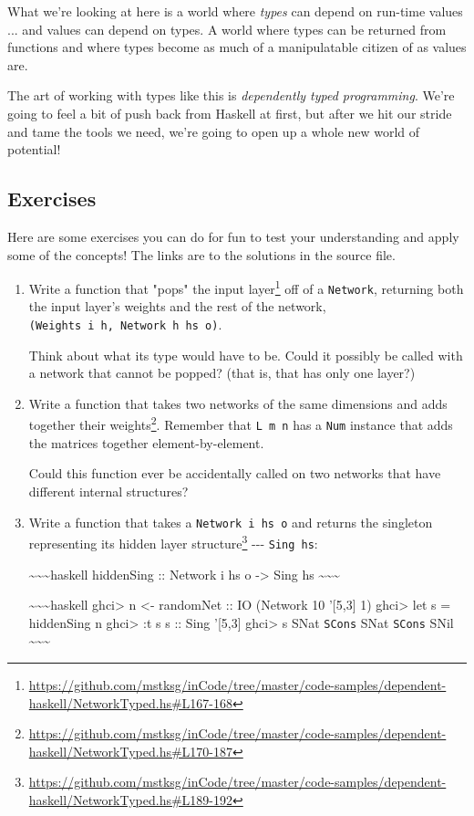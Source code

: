 \documentclass[]{article}
\renewcommand{\href}[2]{#2\footnote{\url{#1}}}
\begin{document}
What we're looking at here is a world where \emph{types} can depend on run-time
values ... and values can depend on types. A world where types can be returned
from functions and where types become as much of a manipulatable citizen of as
values are.

The art of working with types like this is \emph{dependently typed programming}.
We're going to feel a bit of push back from Haskell at first, but after we hit
our stride and tame the tools we need, we're going to open up a whole new world
of potential!

\subsection{Exercises}

Here are some exercises you can do for fun to test your understanding and apply
some of the concepts! The links are to the solutions in the source file.

\begin{enumerate}
\item
  Write a function that
  \href{https://github.com/mstksg/inCode/tree/master/code-samples/dependent-haskell/NetworkTyped.hs\#L167-168}{"pops"
  the input layer} off of a \texttt{Network}, returning both the input layer's
  weights and the rest of the network,
  \texttt{(Weights\ i\ h,\ Network\ h\ hs\ o)}.

  Think about what its type would have to be. Could it possibly be called with a
  network that cannot be popped? (that is, that has only one layer?)
\item
  Write a
  \href{https://github.com/mstksg/inCode/tree/master/code-samples/dependent-haskell/NetworkTyped.hs\#L170-187}{function
  that takes two networks of the same dimensions and adds together their
  weights}. Remember that \texttt{L\ m\ n} has a \texttt{Num} instance that adds
  the matrices together element-by-element.

  Could this function ever be accidentally called on two networks that have
  different internal structures?
\item
  Write a function that takes a \texttt{Network\ i\ hs\ o} and
  \href{https://github.com/mstksg/inCode/tree/master/code-samples/dependent-haskell/NetworkTyped.hs\#L189-192}{returns
  the singleton representing its hidden layer structure} -\/-\/-
  \texttt{Sing\ hs}:

  \textasciitilde{}\textasciitilde{}\textasciitilde{}haskell hiddenSing ::
  Network i hs o -\textgreater{} Sing hs
  \textasciitilde{}\textasciitilde{}\textasciitilde{}

  \textasciitilde{}\textasciitilde{}\textasciitilde{}haskell ghci\textgreater{}
  n \textless{}- randomNet :: IO (Network 10 '{[}5,3{]} 1) ghci\textgreater{}
  let s = hiddenSing n ghci\textgreater{} :t s s :: Sing '{[}5,3{]}
  ghci\textgreater{} s SNat \texttt{SCons} SNat \texttt{SCons} SNil
  \textasciitilde{}\textasciitilde{}\textasciitilde{}
\end{enumerate}
\end{document}
